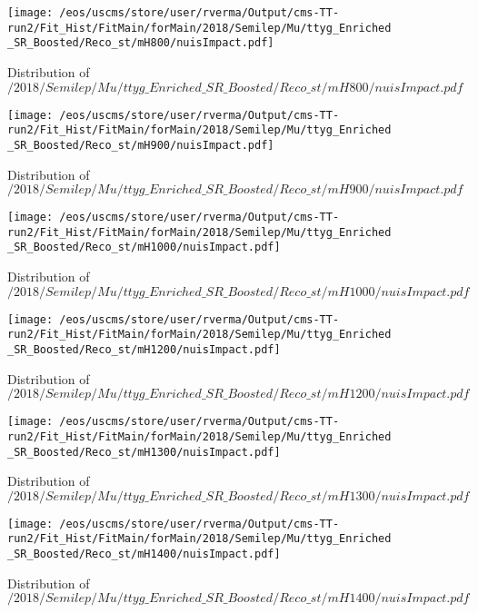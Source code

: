 \begin{figure}
\centering
\texttt{[image: /eos/uscms/store/user/rverma/Output/cms-TT-run2/Fit\_Hist/FitMain/forMain/2018/Semilep/Mu/ttyg\_Enriched\_SR\_Boosted/Reco\_st/mH800/nuisImpact.pdf]}
\caption{Distribution of $/2018/Semilep/Mu/ttyg\_Enriched\_SR\_Boosted/Reco\_st/mH800/nuisImpact.pdf$}
\end{figure}

\begin{figure}
\centering
\texttt{[image: /eos/uscms/store/user/rverma/Output/cms-TT-run2/Fit\_Hist/FitMain/forMain/2018/Semilep/Mu/ttyg\_Enriched\_SR\_Boosted/Reco\_st/mH900/nuisImpact.pdf]}
\caption{Distribution of $/2018/Semilep/Mu/ttyg\_Enriched\_SR\_Boosted/Reco\_st/mH900/nuisImpact.pdf$}
\end{figure}

\begin{figure}
\centering
\texttt{[image: /eos/uscms/store/user/rverma/Output/cms-TT-run2/Fit\_Hist/FitMain/forMain/2018/Semilep/Mu/ttyg\_Enriched\_SR\_Boosted/Reco\_st/mH1000/nuisImpact.pdf]}
\caption{Distribution of $/2018/Semilep/Mu/ttyg\_Enriched\_SR\_Boosted/Reco\_st/mH1000/nuisImpact.pdf$}
\end{figure}

\begin{figure}
\centering
\texttt{[image: /eos/uscms/store/user/rverma/Output/cms-TT-run2/Fit\_Hist/FitMain/forMain/2018/Semilep/Mu/ttyg\_Enriched\_SR\_Boosted/Reco\_st/mH1200/nuisImpact.pdf]}
\caption{Distribution of $/2018/Semilep/Mu/ttyg\_Enriched\_SR\_Boosted/Reco\_st/mH1200/nuisImpact.pdf$}
\end{figure}

\begin{figure}
\centering
\texttt{[image: /eos/uscms/store/user/rverma/Output/cms-TT-run2/Fit\_Hist/FitMain/forMain/2018/Semilep/Mu/ttyg\_Enriched\_SR\_Boosted/Reco\_st/mH1300/nuisImpact.pdf]}
\caption{Distribution of $/2018/Semilep/Mu/ttyg\_Enriched\_SR\_Boosted/Reco\_st/mH1300/nuisImpact.pdf$}
\end{figure}

\begin{figure}
\centering
\texttt{[image: /eos/uscms/store/user/rverma/Output/cms-TT-run2/Fit\_Hist/FitMain/forMain/2018/Semilep/Mu/ttyg\_Enriched\_SR\_Boosted/Reco\_st/mH1400/nuisImpact.pdf]}
\caption{Distribution of $/2018/Semilep/Mu/ttyg\_Enriched\_SR\_Boosted/Reco\_st/mH1400/nuisImpact.pdf$}
\end{figure}

